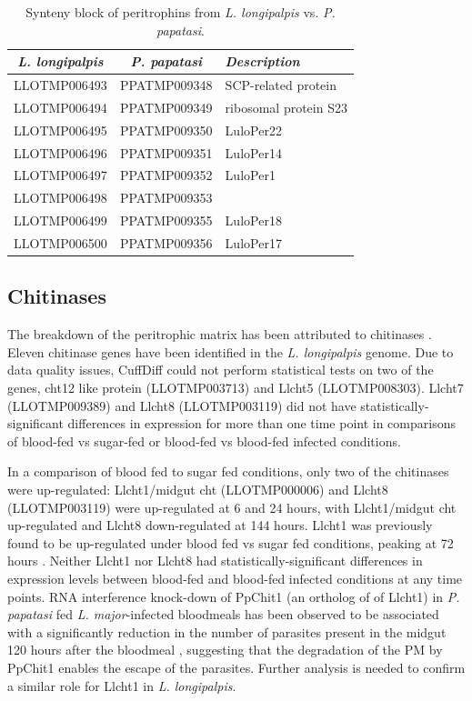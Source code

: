 \begin{table}[H]
  \centering
  \begin{tabular}{c c l} \hline
    \emph{L. longipalpis} & \emph{P. papatasi} & \emph{Description} \\ \hline
    LLOTMP006493 & PPATMP009348 & SCP-related protein \\
    LLOTMP006494 & PPATMP009349 & ribosomal protein S23 \\
    LLOTMP006495 & PPATMP009350 & LuloPer22 \\
    LLOTMP006496 & PPATMP009351 & LuloPer14 \\
    LLOTMP006497 & PPATMP009352 & LuloPer1 \\
    LLOTMP006498 & PPATMP009353 &  \\
    LLOTMP006499 & PPATMP009355 & LuloPer18 \\
    LLOTMP006500 & PPATMP009356 & LuloPer17
  \end{tabular}
  \caption{Synteny block of peritrophins from \emph{L. longipalpis} vs. \emph{P. papatasi}.}
  \label{tab:synteny-llot-ppat-peritrophic}
\end{table}


\subsection{Chitinases}
The breakdown of the peritrophic matrix has been attributed to chitinases \cite{Dostalova2012}. Eleven chitinase genes have been identified in the \emph{L. longipalpis} genome. Due to data quality issues, CuffDiff could not perform statistical tests on two of the genes, cht12 like protein (LLOTMP003713) and Llcht5 (LLOTMP008303). Llcht7 (LLOTMP009389) and Llcht8 (LLOTMP003119) did not have statistically-significant differences in expression for more than one time point in comparisons of blood-fed vs sugar-fed or blood-fed vs blood-fed infected conditions.

In a comparison of blood fed to sugar fed conditions, only two of the chitinases were up-regulated: Llcht1/midgut cht (LLOTMP000006) and Llcht8 (LLOTMP003119) were up-regulated at 6 and 24 hours, with Llcht1/midgut cht up-regulated and Llcht8 down-regulated at 144 hours.  Llcht1 was previously found to be up-regulated under blood fed vs sugar fed conditions, peaking at 72 hours \cite{Ramalho-Ortigao2003}. Neither Llcht1 nor Llcht8 had statistically-significant differences in expression levels between blood-fed and blood-fed infected conditions at any time points. RNA interference knock-down of PpChit1 (an ortholog of of Llcht1) in \emph{P. papatasi} fed \emph{L. major}-infected bloodmeals has been observed to be associated with a significantly reduction in the number of parasites present in the midgut 120 hours after the bloodmeal \cite{Coutinho-abreu2010}, suggesting that the degradation of the PM by PpChit1 enables the escape of the parasites.  Further analysis is needed to confirm a similar role for Llcht1 in \emph{L. longipalpis}. 

